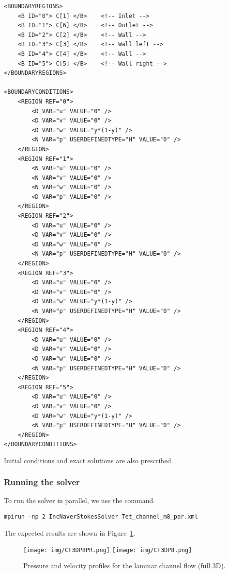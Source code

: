 \begin{lstlisting}[style=XMLStyle]
<BOUNDARYREGIONS>
    <B ID="0"> C[1] </B>    <!-- Inlet -->
    <B ID="1"> C[6] </B>    <!-- Outlet -->
    <B ID="2"> C[2] </B>    <!-- Wall -->
    <B ID="3"> C[3] </B>    <!-- Wall left -->
    <B ID="4"> C[4] </B>    <!-- Wall -->
    <B ID="5"> C[5] </B>    <!-- Wall right -->
</BOUNDARYREGIONS>

<BOUNDARYCONDITIONS>
    <REGION REF="0">
        <D VAR="u" VALUE="0" />
        <D VAR="v" VALUE="0" />
        <D VAR="w" VALUE="y*(1-y)" />
        <N VAR="p" USERDEFINEDTYPE="H" VALUE="0" />
    </REGION>
    <REGION REF="1">
        <N VAR="u" VALUE="0" />
        <N VAR="v" VALUE="0" />
        <N VAR="w" VALUE="0" />
        <D VAR="p" VALUE="0" />
    </REGION>
    <REGION REF="2">
        <D VAR="u" VALUE="0" />
        <D VAR="v" VALUE="0" />
        <D VAR="w" VALUE="0" />
        <N VAR="p" USERDEFINEDTYPE="H" VALUE="0" />
    </REGION>
    <REGION REF="3">
        <D VAR="u" VALUE="0" />
        <D VAR="v" VALUE="0" />
        <D VAR="w" VALUE="y*(1-y)" />
        <N VAR="p" USERDEFINEDTYPE="H" VALUE="0" />
    </REGION>
    <REGION REF="4">
        <D VAR="u" VALUE="0" />
        <D VAR="v" VALUE="0" />
        <D VAR="w" VALUE="0" />
        <N VAR="p" USERDEFINEDTYPE="H" VALUE="0" />
    </REGION>
    <REGION REF="5">
        <D VAR="u" VALUE="0" />
        <D VAR="v" VALUE="0" />
        <D VAR="w" VALUE="y*(1-y)" />
        <N VAR="p" USERDEFINEDTYPE="H" VALUE="0" />
    </REGION>
</BOUNDARYCONDITIONS>
\end{lstlisting}

Initial conditions and exact solutions are also prescribed.

\subsubsection{Running the solver}
To run the solver in parallel, we use the  command.
\begin{lstlisting}[style=BashInputStyle]
mpirun -np 2 IncNaverStokesSolver Tet_channel_m8_par.xml
\end{lstlisting}

The expected results are shown in Figure~\ref{f:incns:laminar3d}.

\begin{figure}
\begin{center}
\texttt{[image: img/CF3DP8PR.png]}
\texttt{[image: img/CF3DP8.png]}
\caption{Pressure and velocity profiles for the laminar channel flow (full 3D).}
\label{f:incns:laminar3d}
\end{center}
\end{figure}


